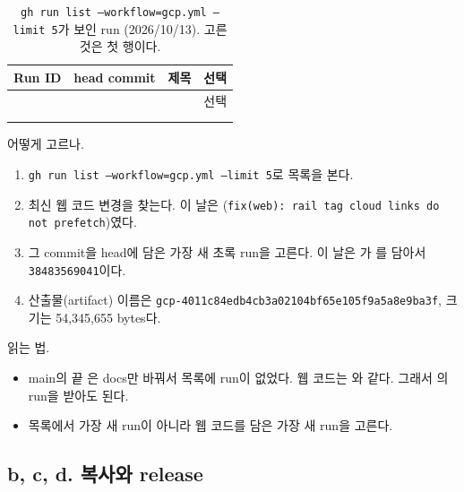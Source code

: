 \begin{table}[H]
  \caption{\texttt{gh run list --workflow=gcp.yml --limit 5}가 보인 run (2026/10/13). 고른 것은 첫 행이다.}
  \label{tab:A-web-runs}
  \centering\footnotesize
  \begin{tabularx}{\linewidth}{@{}L{2.8cm}L{1.6cm}Y L{1.3cm}@{}}
    \toprule
    Run ID & head commit & 제목 & 선택 \\
    \midrule
     &  &  & 선택 \\
    \midrule
     &  &  & \\
    \midrule
     &  &  & \\
    \bottomrule
  \end{tabularx}
\end{table}

어떻게 고르나.
\begin{enumerate}[nosep]
  \item \texttt{gh run list --workflow=gcp.yml --limit 5}로 목록을 본다.
  \item 최신 웹 코드 변경을 찾는다. 이 날은 (\texttt{fix(web): rail tag cloud links do not prefetch})였다.
  \item 그 commit을 head에 담은 가장 새 초록 run을 고른다. 이 날은 가 를 담아서 \texttt{38483569041}이다.
  \item 산출물(artifact) 이름은 \texttt{gcp-4011c84edb4cb3a02104bf65e105f9a5a8e9ba3f}, 크기는 54,345,655 bytes다.
\end{enumerate}

읽는 법.
\begin{itemize}[nosep]
  \item main의 끝 은 docs만 바꿔서 목록에 run이 없었다. 웹 코드는 와 같다. 그래서 의 run을 받아도 된다.
  \item 목록에서 가장 새 run이 아니라 웹 코드를 담은 가장 새 run을 고른다.
\end{itemize}

\subsection{b, c, d. 복사와 release}\label{sec:A-web-release}

